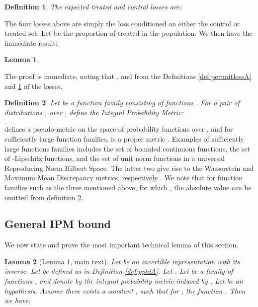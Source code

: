 \documentclass{article}
\newtheorem{thmappdef}{Definition}
\newtheorem{thmapplem}{Lemma}
\begin{document}
\begin{thmappdef}\label{def:decomploss}
The expected \emph{treated} and \emph{control} losses are:




\end{thmappdef}
The four losses above are simply the loss conditioned on either the control or treated set.  Let  be the proportion of treated in the population. We then have the immediate result:
\begin{thmapplem}\label{lem:epsdecopm}


\end{thmapplem}
The proof is immediate, noting that , and from the Definitions \ref{def:perunitlossA} and \ref{def:decomploss} of the losses.

\begin{thmappdef}\label{def:ipm}
Let  be a function family consisting of functions . For a pair of distributions ,  over , define the \emph{Integral Probability Metric}:

\end{thmappdef}
 defines a pseudo-metric on the space of probability functions over , and for sufficiently large function families,  is a proper metric \cite{muller1997integral}. Examples of sufficiently large functions families includes the set of bounded continuous functions, the set of -Lipschitz functions, and the set of unit norm functions in a universal Reproducing Norm Hilbert Space. The latter two give rise to the Wasserstein and Maximum Mean Discrepancy metrics, respectively \cite{gretton2012mmd,sriperumbudur2012empirical}. We note that for function families  such as the three mentioned above, for which , the absolute value can be omitted from definition \ref{def:ipm}.


\subsection{General IPM bound}


We now state and prove the most important technical lemma of this section.
\begin{thmapplem}[Lemma 1, main text]\label{lem:genA}
Let  be an invertible representation with  its inverse. Let  be defined as in Definition \ref{def:pphiA}. Let . Let  be a family of functions , and denote by  the integral probability metric induced by .  Let  be an hypothesis. Assume there exists a constant , such that for , the function . Then we have:

\end{thmapplem}
\end{document}
